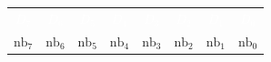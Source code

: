 \begin{tabular}{cccccccc}\rowcolor{DEplava}\textcolor{white}{$D_7$}&\textcolor{white}{$D_6$}&\textcolor{white}{$D_5$}&\textcolor{white}{$D_4$}&\textcolor{white}{$D_3$}&\textcolor{white}{$D_2$}&\textcolor{white}{$D_1$}&\textcolor{white}{$D_0$}\\\rowcolor{DEplava!12}$\mathrm{nb}_{7}$&$\mathrm{nb}_{6}$&$\mathrm{nb}_{5}$&$\mathrm{nb}_{4}$&$\mathrm{nb}_{3}$&$\mathrm{nb}_{2}$&$\mathrm{nb}_{1}$&$\mathrm{nb}_{0}$\end{tabular}